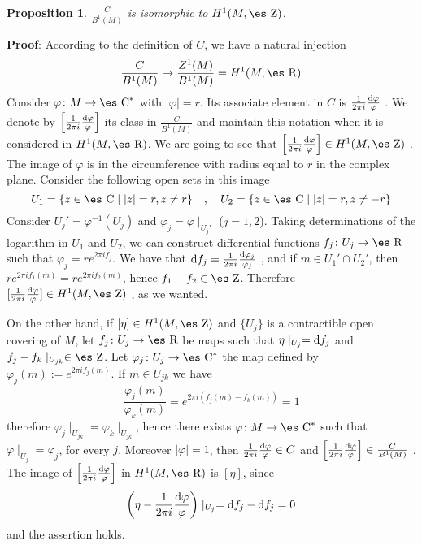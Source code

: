 \documentclass[12pt]{article}
\newtheorem{prop}{Proposition}
\def\dst{\(}
\def\qed{\ifvmode\removelastskip\fi
{\unskip\nobreak\hfil\penalty50\hbox{}\nobreak\hfil
\hbox{\vrule height1.2ex width1.2ex}\parfillskip=0pt
\finalhyphendemerits=0 \par\smallskip}}
\def\d{{\rm d}}
\def\Zahl{\mbox{\es Z}}
\def\Real{\mbox{\es R}}
\def\Complex{\mbox{\es C}}
\begin{document}
\begin{prop}
\dst\frac{C}{B^1(M)}\) is isomorphic to $H^1(M,\Zahl )$.
\end{prop}
{\bf Proof}: 
According to the definition of $C$, we have a natural injection
$$
\frac{C}{B^1(M)} \to \frac{Z^1(M)}{B^1(M)} = H^1(M,\Real )
$$
Consider $\varphi \colon M \to \Complex^*$ with $| \varphi | = r$.
Its associate element in $C$ is \dst\frac{1}{2\pi i}\frac{\d
\varphi}{\varphi}\) .
We denote by \dst\left[\frac{1}{2\pi i}\frac{\d
\varphi}{\varphi}\right]\)
its class in $\frac{C}{B^1(M)}$
and maintain this notation when it is considered in $H^1(M,\Real )$.
We are going to see that
\dst\left[\frac{1}{2\pi i}\frac{\d \varphi}{\varphi}\right] \in
H^1(M,\Zahl )\) .
The image of $\varphi$ is in the circumference
with radius equal to $r$ in the complex plane.
Consider the following open sets in this image
$$
U_1 = \{z \in \Complex \mid |z| = r , z \not= r \}
\quad , \quad
U_2 = \{z \in \Complex \mid |z| = r , z \not= -r \}
$$
Consider $U_j' =\varphi^{-1}(U_j)$
and
$\varphi_j = \varphi \mid_{U_j'}$ ($j=1,2$).
Taking determinations of the logarithm in $U_1$ and $U_2$,
we can construct differential functions $f_j \colon U_j \to \Real$
such that $\varphi _j = re^{2\pi i f_j}$.
We have that \dst\d f_j =\frac{1}{2\pi i}\frac{\d
\varphi_j}{\varphi_j}\) ,
and if $m \in U_1' \cap U_2'$, then
$re^{2\pi if_1(m)} = re^{2\pi if_2(m)}$, hence $f_1-f_2 \in \Zahl$.
Therefore \dst[\frac{1}{2\pi i}\frac{\d \varphi}{\varphi}] \in
H^1(M,\Zahl )\) ,
as we wanted.

On the other hand, if $[\eta ] \in H^1(M,\Zahl )$
and $\{ U_j \}$ is a contractible open covering of $M$,
let $f_j \colon U_j \to \Real$ be maps such that
$\eta \mid_{U_j} = \d f_j$ and $f_j-f_k \mid_{U_{jk}} \in \Zahl$.
Let $\varphi_j \colon U_j \to \Complex^*$
the map defined by $\varphi_j(m) := e^{2\pi if_j(m)}$.
If $m \in U_{jk}$ we have
$$
\frac{\varphi_j(m)}{\varphi_k(m)} = e^{2\pi i(f_j(m)-f_k(m))} = 1
$$
therefore $\varphi_j\mid_{U_{jk}} = \varphi_k\mid_{U_{jk}}$,
hence there exists $\varphi \colon M \to \Complex^*$
such that $\varphi \mid_{U_j} = \varphi_j$, for every $j$.
Moreover $|\varphi | = 1$, then
\dst\frac{1}{2\pi i}\frac{\d \varphi}{\varphi} \in C\) and
\dst\left[\frac{1}{2\pi i}\frac{\d \varphi}{\varphi}\right] \in
\frac{C}{B^1(M)}\) .
The image of
\dst\left[\frac{1}{2\pi i}\frac{\d \varphi}{\varphi}\right]\) in
$H^1(M,\Real )$
is $[\eta ]$, since
$$
\biggl( \eta - \frac{1}{2\pi i}\frac{\d \varphi}{\varphi} \biggr)
\mid_{U_j} = \d f_j - \d f_j = 0
$$
and the assertion holds.
\qed
\end{document}
